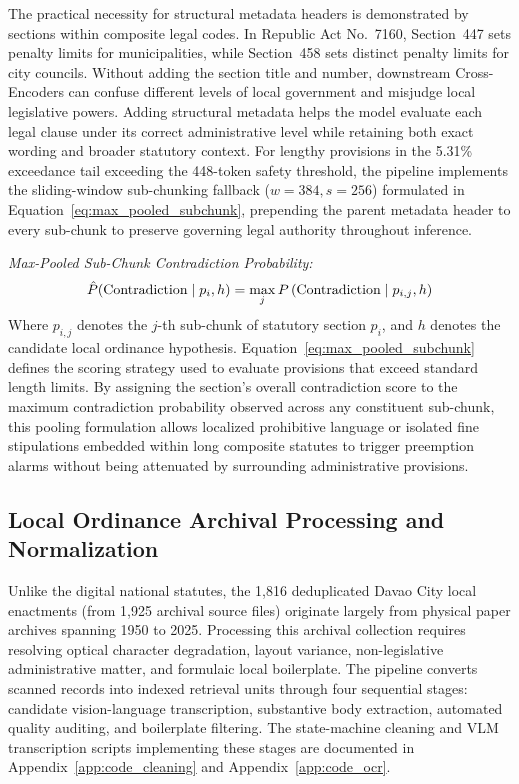         The practical necessity for structural metadata headers is demonstrated by sections within composite legal codes. In Republic Act No.~7160, Section~447 sets penalty limits for municipalities, while Section~458 sets distinct penalty limits for city councils. Without adding the section title and number, downstream Cross-Encoders can confuse different levels of local government and misjudge local legislative powers. Adding structural metadata helps the model evaluate each legal clause under its correct administrative level while retaining both exact wording and broader statutory context. For lengthy provisions in the 5.31\% exceedance tail exceeding the 448-token safety threshold, the pipeline implements the sliding-window sub-chunking fallback ($w=384, s=256$) formulated in Equation~\ref{eq:max_pooled_subchunk}, prepending the parent metadata header to every sub-chunk to preserve governing legal authority throughout inference.

        \noindent\textit{Max-Pooled Sub-Chunk Contradiction Probability:}
        \begin{equation}
            \hat{P}(\text{Contradiction} \mid p_i, h) = \max_{j} P\left(\text{Contradiction} \mid p_{i,j}, h\right)
            \label{eq:max_pooled_subchunk}
            \eqcaption{Max-Pooled Sub-Chunk Contradiction Probability}
        \end{equation}
        \noindent Where $p_{i,j}$ denotes the $j$-th sub-chunk of statutory section $p_i$, and $h$ denotes the candidate local ordinance hypothesis. Equation~\ref{eq:max_pooled_subchunk} defines the scoring strategy used to evaluate provisions that exceed standard length limits. By assigning the section's overall contradiction score to the maximum contradiction probability observed across any constituent sub-chunk, this pooling formulation allows localized prohibitive language or isolated fine stipulations embedded within long composite statutes to trigger preemption alarms without being attenuated by surrounding administrative provisions.

    \subsection{Local Ordinance Archival Processing and Normalization}
    \label{sec:local_preprocessing}
    \label{sec:vlm_digitization_pipeline}
    \label{sec:substantive_extraction}
    \label{sec:quality_audit_normalization}
    \label{sec:advisory_review_architecture}
    Unlike the digital national statutes, the 1,816 deduplicated Davao City local enactments (from 1,925 archival source files) originate largely from physical paper archives spanning 1950 to 2025. Processing this archival collection requires resolving optical character degradation, layout variance, non-legislative administrative matter, and formulaic local boilerplate. The pipeline converts scanned records into indexed retrieval units through four sequential stages: candidate vision-language transcription, substantive body extraction, automated quality auditing, and boilerplate filtering. The state-machine cleaning and VLM transcription scripts implementing these stages are documented in Appendix~\ref{app:code_cleaning} and Appendix~\ref{app:code_ocr}.

